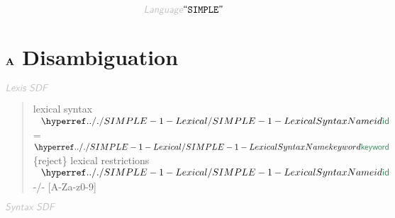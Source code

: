 \begin{displaymath}
\KEY{Language} \STRING{SIMPLE}
\end{displaymath}

\section*{$\SECT{A}$ Disambiguation}\hypertarget{secta-disambiguation}{}\label{secta-disambiguation}

$\KEY{Lexis SDF}$

\begin{quote}
lexical syntax \newline
  $\SHADE{~~\SYNHYPER{../.}{SIMPLE-1-Lexical}{id}}$ = $\SHADE{\SYNHYPER{../.}{SIMPLE-1-Lexical}{keyword}}$ \{reject\}\newline
\newline
lexical restrictions\newline
  $\SHADE{~~\SYNHYPER{../.}{SIMPLE-1-Lexical}{id}}$ -/- {[}A-Za-z0-9{]}
\end{quote}

$\KEY{Syntax SDF}$


